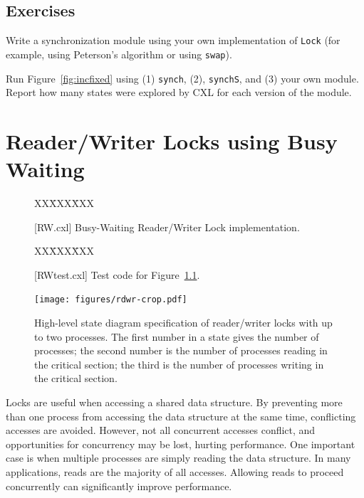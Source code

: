 \documentclass{report}
\newcommand{\cxlsource}[1]{
\begin{tabbing}
XX\=XXX\=XXX\kill
    
\end{tabbing}
}
\newenvironment{code}{
\tcolorbox
}{
\endtcolorbox
}
\begin{document}
\section*{Exercises}
\begin{problems}
\item Write a synchronization module using your own implementation of \texttt{Lock}
(for example, using Peterson's algorithm or using \texttt{swap}).
\item
Run Figure~\ref{fig:incfixed} using (1) \texttt{synch}, (2), \texttt{synchS},
and (3) your own module.  Report how many states were explored by CXL for each
version of the module.
\end{problems}

\chapter{Reader/Writer Locks using Busy Waiting}
\label{ch:rdwrbusy}


\begin{figure}
\begin{code}
\cxlsource{RW}
\end{code}
\caption{[RW.cxl] Busy-Waiting Reader/Writer Lock implementation.}
\label{fig:rwbusy}
\end{figure}

\begin{figure}
\begin{code}
\cxlsource{RWtest}
\end{code}
\caption{[RWtest.cxl] Test code for Figure~\ref{fig:rwbusy}.}
\label{fig:rwbusytest}
\end{figure}

\begin{figure}
\begin{center}
\texttt{[image: figures/rdwr-crop.pdf]}
\end{center}
\caption{High-level state diagram specification of reader/writer locks with
up to two processes.
The first number in a state gives the number of processes; the second number is the
number of processes reading in the critical section; the third is the number of
processes writing in the critical section.}
\label{fig:rdwr}
\end{figure}

Locks are useful when accessing a shared data structure.  By preventing
more than one process from accessing the data structure at the same
time, conflicting accesses are avoided.  However, not all concurrent
accesses conflict, and opportunities for concurrency may be lost,
hurting performance.  One important case is when multiple processes
are simply reading the data structure.
In many applications, reads are the majority of all accesses.
Allowing reads to proceed concurrently can significantly improve performance.
\end{document}
